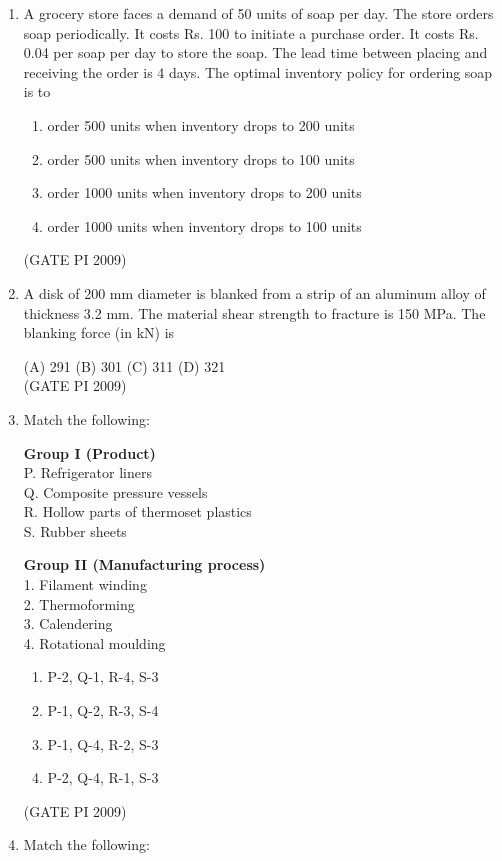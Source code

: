 \documentclass[journal,12pt,onecolumn]{IEEEtran}
\theoremstyle{remark}
\begin{document}
\begin{enumerate}[label=Q.\arabic*]
(A) 0.10 \hfill (B) 0.25 \hfill C) 0.40 \hfill (D) 0.75 \\

\hfill (GATE PI 2009)
\item A grocery store faces a demand of 50 units of soap per day. The store orders soap periodically. It costs Rs. 100 to initiate a purchase order. It costs Rs. 0.04 per soap per day to store the soap. The lead time between placing and receiving the order is 4 days. The optimal inventory policy for ordering soap is to
\begin{enumerate}[label=(\Alph*)]
\item order 500 units when inventory drops to 200 units 
\item order 500 units when inventory drops to 100 units
\item order 1000 units when inventory drops to 200 units
\item order 1000 units when inventory drops to 100 units
\end{enumerate}
\hfill (GATE PI 2009)
\item A disk of 200 mm diameter is blanked from a strip of an aluminum alloy of thickness 3.2 mm. The material shear strength to fracture is 150 MPa. The blanking force (in kN) is

(A) 291 \hfill (B) 301 \hfill(C) 311 \hfill (D) 321  \\

\hfill (GATE PI 2009)
\noindent 
\item Match the following:

\noindent
\begin{minipage}[t]{0.45\textwidth}
\textbf{Group I (Product)}\\[0.5em]
P. Refrigerator liners \\
Q. Composite pressure vessels \\
R. Hollow parts of thermoset plastics \\
S. Rubber sheets
\end{minipage}
\hfill
\begin{minipage}[t]{0.45\textwidth}
\textbf{Group II (Manufacturing process)}\\[0.5em]
1. Filament winding \\
2. Thermoforming \\
3. Calendering \\
4. Rotational moulding
\end{minipage}

\begin{multicols}{2}
\begin{enumerate}[label=(\Alph*)]
    \item P-2, Q-1, R-4, S-3
    \item P-1, Q-2, R-3, S-4
    \item P-1, Q-4, R-2, S-3
    \item P-2, Q-4, R-1, S-3
\end{enumerate}
\end{multicols}
\hfill (GATE PI 2009)
\noindent 
\item Match the following:


\end{enumerate}
\end{document}
